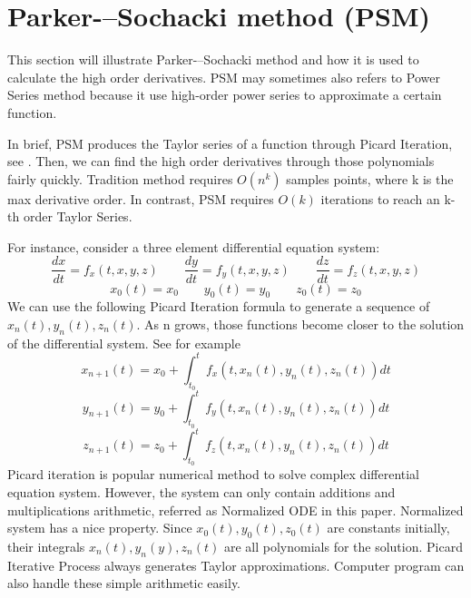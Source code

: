 \documentclass[12pt]{article}
\begin{document}
\section{Parker-–Sochacki method (PSM)}

This section will illustrate Parker-–Sochacki method and how it is used to calculate the high order derivatives. PSM may sometimes also refers to Power Series method because it use high-order power series to approximate a certain function.

In brief, PSM produces the Taylor series of a function through Picard Iteration, see \cite{PSM}. Then, we can find the high order derivatives through those polynomials fairly quickly. Tradition method requires $O(n^{k})$ samples points, where k is the max derivative order. In contrast, PSM requires $O(k)$ iterations to reach an k-th order Taylor Series.

For instance, consider a three element differential equation system:
\begin{equation}
\frac{dx}{dt} = f_{x}(t, x, y, z) \qquad
\frac{dy}{dt} = f_{y}(t, x, y, z) \qquad
\frac{dz}{dt} = f_{z}(t, x, y, z)
\end{equation}	
\begin{equation}
x_{0}(t) = x_{0} \qquad
y_{0}(t) = y_{0} \qquad
z_{0}(t) = z_{0}
\end{equation}
We can use the following Picard Iteration formula to generate a sequence of $x_{n}(t),y_{n}(t),z_{n}(t)$. As n grows, those functions become closer to the solution of the differential system. See for example \cite{PICARD}
\begin{equation}
x_{n+1}(t) = x_{0} + \int_{t_{0}}^{t} f_{x}(t, x_{n}(t),y_{n}(t),z_{n}(t)) dt
\end{equation}
\begin{equation}
y_{n+1}(t) = y_{0} + \int_{t_{0}}^{t} f_{y}(t, x_{n}(t),y_{n}(t),z_{n}(t)) dt
\end{equation}
\begin{equation}
z_{n+1}(t) = z_{0} + \int_{t_{0}}^{t} f_{z}(t, x_{n}(t),y_{n}(t),z_{n}(t)) dt
\end{equation}
Picard iteration is popular numerical method to solve complex differential equation system. However, the system can only contain additions and multiplications arithmetic, referred as Normalized ODE in this paper.
Normalized system has a nice property. Since $x_{0}(t),y_{0}(t),z_{0}(t)$ are constants initially, their integrals $x_{n}(t),y_{n}(y),z_{n}(t)$ are all polynomials for the solution. Picard Iterative Process always generates Taylor approximations. Computer program can also handle these simple arithmetic easily.
\end{document}
